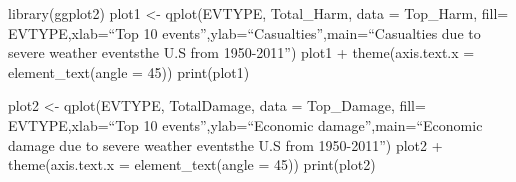 \documentclass[
]{article}
\begin{document}
library(ggplot2) plot1 \textless- qplot(EVTYPE, Total\_Harm, data =
Top\_Harm, fill= EVTYPE,xlab=``Top 10
events'',ylab=``Casualties'',main=``Casualties due to severe weather
events\nin the U.S from 1950-2011'') plot1 + theme(axis.text.x =
element\_text(angle = 45)) print(plot1)

plot2 \textless- qplot(EVTYPE, TotalDamage, data = Top\_Damage, fill=
EVTYPE,xlab=``Top 10 events'',ylab=``Economic damage'',main=``Economic
damage due to severe weather events\nin the U.S from 1950-2011'') plot2
+ theme(axis.text.x = element\_text(angle = 45)) print(plot2)
\end{document}
